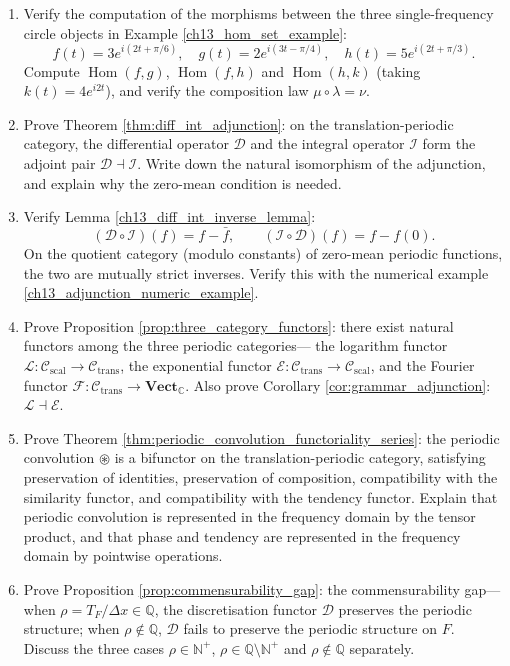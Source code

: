 \begin{enumerate}[leftmargin=3em, label=\textbf{Exercise \arabic*}]
    \item Verify the computation of the morphisms between the three single-frequency circle objects in Example \ref{ch13_hom_set_example}:
    \[
    f(t)=3e^{i(2t+\pi/6)},\quad
    g(t)=2e^{i(3t-\pi/4)},\quad
    h(t)=5e^{i(2t+\pi/3)}.
    \]
    Compute $\operatorname{Hom}(f,g)$, $\operatorname{Hom}(f,h)$ and $\operatorname{Hom}(h,k)$ (taking $k(t)=4e^{i2t}$),
    and verify the composition law $\mu\circ\lambda=\nu$.

    \item Prove Theorem \ref{thm:diff_int_adjunction}:
    on the translation-periodic category, the differential operator $\mathcal{D}$ and the integral operator $\mathcal{I}$
    form the adjoint pair $\mathcal{D}\dashv\mathcal{I}$.
    Write down the natural isomorphism of the adjunction, and explain why the zero-mean condition is needed.

    \item Verify Lemma \ref{ch13_diff_int_inverse_lemma}:
    \[
    (\mathcal{D}\circ\mathcal{I})(f)=f-\bar{f},\qquad
    (\mathcal{I}\circ\mathcal{D})(f)=f-f(0).
    \]
    On the quotient category (modulo constants) of zero-mean periodic functions, the two are mutually strict inverses.
    Verify this with the numerical example \ref{ch13_adjunction_numeric_example}.

    \item Prove Proposition \ref{prop:three_category_functors}:
    there exist natural functors among the three periodic categories---
    the logarithm functor $\mathcal{L}:\mathcal{C}_{\text{scal}}\to\mathcal{C}_{\text{trans}}$,
    the exponential functor $\mathcal{E}:\mathcal{C}_{\text{trans}}\to\mathcal{C}_{\text{scal}}$,
    and the Fourier functor $\mathcal{F}:\mathcal{C}_{\text{trans}}\to\mathbf{Vect}_{\mathbb{C}}$.
    Also prove Corollary \ref{cor:grammar_adjunction}: $\mathcal{L}\dashv\mathcal{E}$.

    \item Prove Theorem \ref{thm:periodic_convolution_functoriality_series}:
    the periodic convolution $\circledast$ is a bifunctor on the translation-periodic category, satisfying
    preservation of identities, preservation of composition, compatibility with the similarity functor, and compatibility with the tendency functor.
    Explain that periodic convolution is represented in the frequency domain by the tensor product, and that phase and tendency are represented in the frequency domain by pointwise operations.

    \item Prove Proposition \ref{prop:commensurability_gap}:
    the commensurability gap---when $\rho=T_F/\Delta x\in\mathbb{Q}$,
    the discretisation functor $\mathcal{D}$ preserves the periodic structure;
    when $\rho\notin\mathbb{Q}$, $\mathcal{D}$ fails to preserve the periodic structure on $F$.
    Discuss the three cases $\rho\in\mathbb{N}^+$, $\rho\in\mathbb{Q}\setminus\mathbb{N}^+$ and $\rho\notin\mathbb{Q}$ separately.


\end{enumerate}
